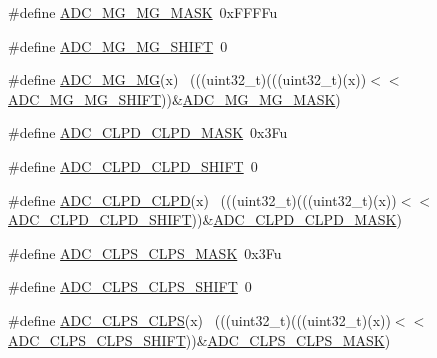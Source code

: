 \begin{DoxyCompactItemize}
\item 
\#define \hyperlink{group___a_d_c___register___masks_ga9f415258af1bad0159dd605efccd043b}{A\+D\+C\+\_\+\+M\+G\+\_\+\+M\+G\+\_\+\+M\+A\+SK}~0x\+F\+F\+F\+Fu
\item 
\#define \hyperlink{group___a_d_c___register___masks_ga4b2717da089f0de5bd41ef91001b7cfe}{A\+D\+C\+\_\+\+M\+G\+\_\+\+M\+G\+\_\+\+S\+H\+I\+FT}~0
\item 
\#define \hyperlink{group___a_d_c___register___masks_gac6b5db2e032965ca7bf626469aaeb8c3}{A\+D\+C\+\_\+\+M\+G\+\_\+\+MG}(x)                                                      ~(((uint32\+\_\+t)(((uint32\+\_\+t)(x))$<$$<$\hyperlink{group___a_d_c___register___masks_ga4b2717da089f0de5bd41ef91001b7cfe}{A\+D\+C\+\_\+\+M\+G\+\_\+\+M\+G\+\_\+\+S\+H\+I\+FT}))\&\hyperlink{group___a_d_c___register___masks_ga9f415258af1bad0159dd605efccd043b}{A\+D\+C\+\_\+\+M\+G\+\_\+\+M\+G\+\_\+\+M\+A\+SK})
\item 
\#define \hyperlink{group___a_d_c___register___masks_gaae8d6090ede9d73497ae3e0b4fa2c6cd}{A\+D\+C\+\_\+\+C\+L\+P\+D\+\_\+\+C\+L\+P\+D\+\_\+\+M\+A\+SK}~0x3\+Fu
\item 
\#define \hyperlink{group___a_d_c___register___masks_ga14a354b0de262fc93f30472e99bbe9bc}{A\+D\+C\+\_\+\+C\+L\+P\+D\+\_\+\+C\+L\+P\+D\+\_\+\+S\+H\+I\+FT}~0
\item 
\#define \hyperlink{group___a_d_c___register___masks_gaa6303d44f58e5fdb2c1211b5afdd9dd4}{A\+D\+C\+\_\+\+C\+L\+P\+D\+\_\+\+C\+L\+PD}(x)                                              ~(((uint32\+\_\+t)(((uint32\+\_\+t)(x))$<$$<$\hyperlink{group___a_d_c___register___masks_ga14a354b0de262fc93f30472e99bbe9bc}{A\+D\+C\+\_\+\+C\+L\+P\+D\+\_\+\+C\+L\+P\+D\+\_\+\+S\+H\+I\+FT}))\&\hyperlink{group___a_d_c___register___masks_gaae8d6090ede9d73497ae3e0b4fa2c6cd}{A\+D\+C\+\_\+\+C\+L\+P\+D\+\_\+\+C\+L\+P\+D\+\_\+\+M\+A\+SK})
\item 
\#define \hyperlink{group___a_d_c___register___masks_gaccedf61066feb0b1c6d6bd7794d2a79c}{A\+D\+C\+\_\+\+C\+L\+P\+S\+\_\+\+C\+L\+P\+S\+\_\+\+M\+A\+SK}~0x3\+Fu
\item 
\#define \hyperlink{group___a_d_c___register___masks_ga94f5e6c337622e8c4b8d03201e1c2d11}{A\+D\+C\+\_\+\+C\+L\+P\+S\+\_\+\+C\+L\+P\+S\+\_\+\+S\+H\+I\+FT}~0
\item 
\#define \hyperlink{group___a_d_c___register___masks_ga41a46959a24ace39179d4305e102e44d}{A\+D\+C\+\_\+\+C\+L\+P\+S\+\_\+\+C\+L\+PS}(x)                                              ~(((uint32\+\_\+t)(((uint32\+\_\+t)(x))$<$$<$\hyperlink{group___a_d_c___register___masks_ga94f5e6c337622e8c4b8d03201e1c2d11}{A\+D\+C\+\_\+\+C\+L\+P\+S\+\_\+\+C\+L\+P\+S\+\_\+\+S\+H\+I\+FT}))\&\hyperlink{group___a_d_c___register___masks_gaccedf61066feb0b1c6d6bd7794d2a79c}{A\+D\+C\+\_\+\+C\+L\+P\+S\+\_\+\+C\+L\+P\+S\+\_\+\+M\+A\+SK})
$$
\end{DoxyCompactItemize}
